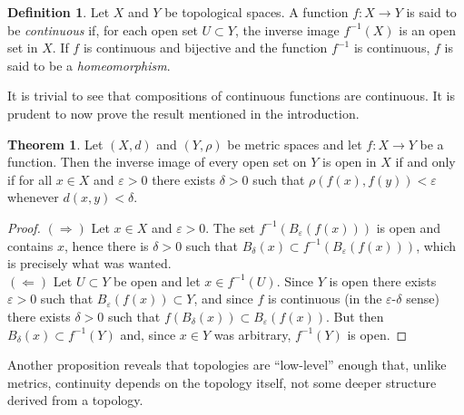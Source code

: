 \documentclass{book}
\theoremstyle{definition}
\newtheorem{theorem}{Theorem}[section]
\newtheorem{definition}{Definition}[section]
\theoremstyle{remark}
\newtheorem{remark}{Remark}[section]
\begin{document}
\begin{definition}
Let $X$ and $Y$ be topological spaces. A function $f:X\to Y$ is said to be \textit{continuous} if, for each open set $U\subset Y$, the inverse image $f^{-1}(X)$ is an open set in $X$. If $f$ is continuous and bijective and the function $f^{-1}$ is continuous, $f$ is said to be a \textit{homeomorphism}.
\end{definition}


It is trivial to see that compositions of continuous functions are continuous. It is prudent to now prove the result mentioned in the introduction.

\begin{theorem}
\label{epsilondelta}
Let $(X,d)$ and $(Y,\rho)$ be metric spaces and let $f:X\to Y$ be a function. Then the inverse image of every open set on $Y$ is open in $X$ if and only if for all $x\in X$ and $\varepsilon>0$ there exists $\delta>0$ such that $\rho(f(x),f(y))<\varepsilon$ whenever $d(x,y)<\delta$.
\end{theorem}
\begin{proof}
$(\Rightarrow)$ Let $x\in X$ and $\varepsilon>0$. The set $f^{-1}(B_\varepsilon(f(x)))$ is open and contains $x$, hence there is $\delta>0$ such that $B_\delta(x)\subset f^{-1}(B_\varepsilon(f(x)))$, which is precisely what was wanted.\\
$(\Leftarrow)$ Let $U\subset Y$ be open and let $x\in f^{-1}(U)$. Since $Y$ is open there exists $\varepsilon>0$ such that $B_\varepsilon(f(x))\subset Y$, and since $f$ is continuous (in the $\varepsilon$-$\delta$ sense) there exists $\delta>0$ such that $f(B_\delta(x))\subset B_\varepsilon(f(x))$. But then $B_\delta(x)\subset f^{-1}(Y)$ and, since $x\in Y$ was arbitrary, $f^{-1}(Y)$ is open.
\end{proof}

Another proposition reveals that topologies are ``low-level'' enough that, unlike metrics, continuity depends on the topology itself, not some deeper structure derived from a topology.
\end{document}

